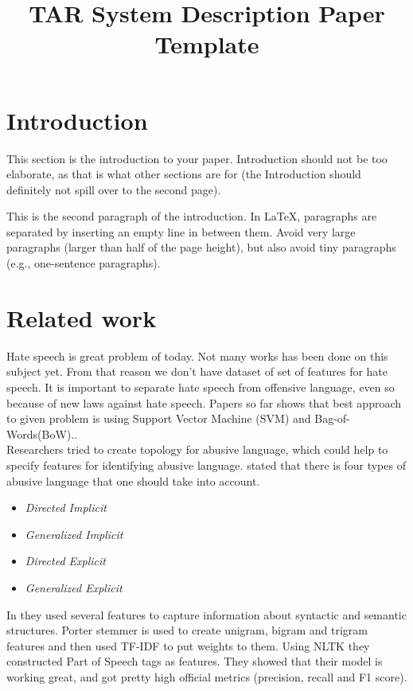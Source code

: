 \documentclass[10pt, a4paper]{article}
\title{TAR System Description Paper Template}
\begin{document}
\maketitleabstract

\section{Introduction}

This section is the introduction to your paper. Introduction should not be too elaborate, as that is what other sections are for (the Introduction should definitely not spill over to the second page). 

This is the second paragraph of the introduction. In \LaTeX , paragraphs are separated by inserting an empty line in between them.  Avoid very large paragraphs (larger than half of the page height), but also avoid tiny paragraphs (e.g., one-sentence paragraphs).

\section{Related work}

Hate speech is great problem of today. Not many works has been done on this subject yet. From that reason we don't have dataset of set of features for hate speech. It is important to separate hate speech from offensive language, even so because of new laws against hate speech\cite{Davidson2017AutomatedHS}. Papers so far shows that best approach to given problem is using Support Vector Machine (SVM) and Bag-of-Words(BoW).\cite{Davidson2017AutomatedHS}.
\\Researchers tried to create topology for abusive language, which could help to specify features for identifying abusive language.\cite{WaseemUnderstandingAbuse} stated that there is four types of abusive language that one should take into account.
\begin{itemize}
	\item \textit{Directed Implicit}
	\item \textit{Generalized Implicit}
	\item \textit{Directed Explicit}
	\item \textit{Generalized Explicit}
\end{itemize}

In \cite{Davidson2017AutomatedHS} they used several features to capture information about syntactic and semantic structures. Porter stemmer is used to create unigram, bigram and trigram features and then used TF-IDF to put weights to them. Using NLTK they constructed Part of Speech tags as features. They showed that their model is working great, and got pretty high official metrics (precision, recall and F1 score).
\end{document}
